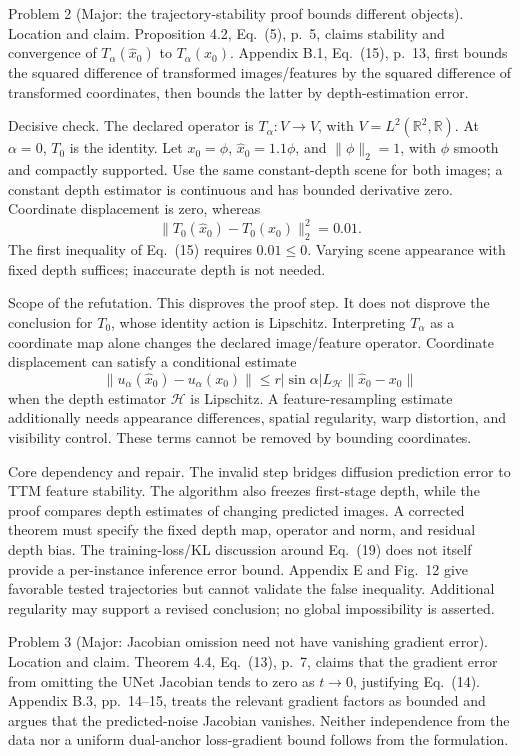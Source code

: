\documentclass[10pt]{article}
\begin{document}
Problem 2 (Major: the trajectory-stability proof bounds different objects).  Location and claim. Proposition 4.2, Eq. (5), p. 5, claims stability and convergence of \(T_\alpha(\widehat x_0)\) to \(T_\alpha(x_0)\). Appendix B.1, Eq. (15), p. 13, first bounds the squared difference of transformed images/features by the squared difference of transformed coordinates, then bounds the latter by depth-estimation error.\par
Decisive check. The declared operator is \(T_\alpha:V\to V\), with \(V=L^2(\mathbb R^2,\mathbb R)\). At \(\alpha=0\), \(T_0\) is the identity. Let \(x_0=\phi\), \(\widehat x_0=1.1\phi\), and \(\|\phi\|_2=1\), with \(\phi\) smooth and compactly supported. Use the same constant-depth scene for both images; a constant depth estimator is continuous and has bounded derivative zero. Coordinate displacement is zero, whereas \[\|T_0(\widehat x_0)-T_0(x_0)\|_2^2=0.01.\] The first inequality of Eq. (15) requires \(0.01\leq0\). Varying scene appearance with fixed depth suffices; inaccurate depth is not needed.\par
Scope of the refutation. This disproves the proof step. It does not disprove the conclusion for \(T_0\), whose identity action is Lipschitz. Interpreting \(T_\alpha\) as a coordinate map alone changes the declared image/feature operator. Coordinate displacement can satisfy a conditional estimate \[\|u_\alpha(\widehat x_0)-u_\alpha(x_0)\|
 \leq r|\sin\alpha|L_{\mathcal H}\|\widehat x_0-x_0\|\] when the depth estimator \(\mathcal H\) is Lipschitz. A feature-resampling estimate additionally needs appearance differences, spatial regularity, warp distortion, and visibility control. These terms cannot be removed by bounding coordinates.\par
Core dependency and repair. The invalid step bridges diffusion prediction error to TTM feature stability. The algorithm also freezes first-stage depth, while the proof compares depth estimates of changing predicted images. A corrected theorem must specify the fixed depth map, operator and norm, and residual depth bias. The training-loss/KL discussion around Eq. (19) does not itself provide a per-instance inference error bound. Appendix E and Fig. 12 give favorable tested trajectories but cannot validate the false inequality. Additional regularity may support a revised conclusion; no global impossibility is asserted.\par
Problem 3 (Major: Jacobian omission need not have vanishing gradient error).  Location and claim. Theorem 4.4, Eq. (13), p. 7, claims that the gradient error from omitting the UNet Jacobian tends to zero as \(t\to0\), justifying Eq. (14). Appendix B.3, pp. 14–15, treats the relevant gradient factors as bounded and argues that the predicted-noise Jacobian vanishes. Neither independence from the data nor a uniform dual-anchor loss-gradient bound follows from the formulation.\par
\end{document}
